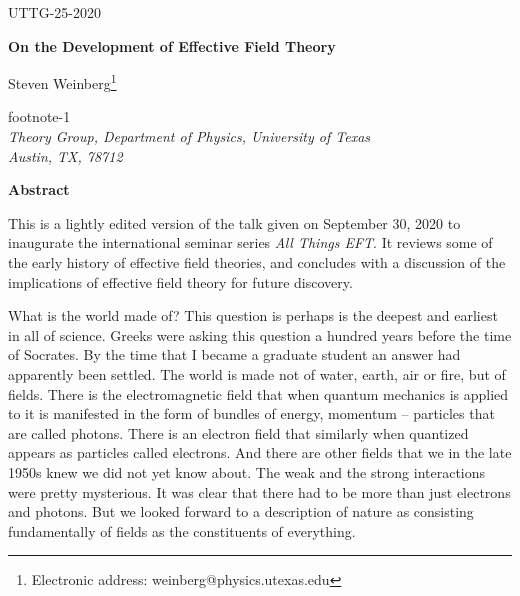 \documentclass[12pt]{article}
\def\fnote#1#2{\begingroup\def\thefootnote{#1}\footnote{#2}\addtocounter
{footnote}{-1}\endgroup}
\begin{document}
\hfill{UTTG-25-2020}








\begin{center}

{\bf On the Development of Effective Field Theory}

\vspace{20pt}

Steven Weinberg\fnote{*}{Electronic address:
weinberg@physics.utexas.edu}\\
{\em Theory Group, Department of Physics, University of
Texas\\
Austin, TX, 78712}

\vspace{20pt}

{\bf Abstract}

\end{center}





 This is a lightly edited version of the talk given on September 30, 2020 to inaugurate the international seminar series  {\it All Things EFT}.  It reviews some of the early history of effective field theories, and concludes with a discussion of the implications of effective field theory for future discovery.\\

\vspace{15pt}







What is the world made of?  This question  is  perhaps is the deepest and  earliest in all of science.  Greeks were asking this question a hundred years before the time of Socrates. By the time that I became a graduate student an answer had  apparently been settled.  The world is made not of water, earth, air or fire, but of fields. There is the electromagnetic field that when quantum mechanics is applied to it is manifested in the form of bundles of energy, momentum -- particles that are called photons. There is an electron field that similarly when quantized appears as particles called electrons. And there are other fields that we in the late 1950s knew we did not yet know about. The weak and the strong interactions were pretty mysterious. It was clear that there had to be more than just electrons and photons. But we looked forward to a description of nature as consisting fundamentally of fields as the constituents of everything. 
\end{document}
